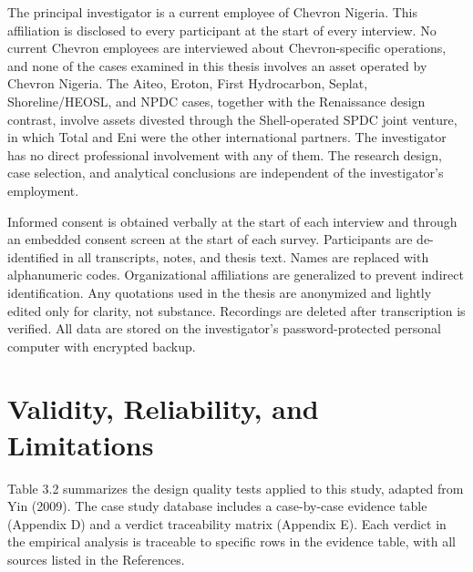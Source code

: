 The principal investigator is a current employee of Chevron Nigeria.
This affiliation is disclosed to every participant at the start of every
interview. No current Chevron employees are interviewed about
Chevron-specific operations, and none of the cases examined in this
thesis involves an asset operated by Chevron Nigeria. The Aiteo, Eroton,
First Hydrocarbon, Seplat, Shoreline/HEOSL, and NPDC cases, together
with the Renaissance design contrast, involve assets divested through
the Shell-operated SPDC joint venture, in which Total and Eni were the
other international partners. The investigator has no direct
professional involvement with any of them. The research design, case
selection, and analytical conclusions are independent of the
investigator's employment.

Informed consent is obtained verbally at the start of each interview and
through an embedded consent screen at the start of each survey.
Participants are de-identified in all transcripts, notes, and thesis
text. Names are replaced with alphanumeric codes. Organizational
affiliations are generalized to prevent indirect identification. Any
quotations used in the thesis are anonymized and lightly edited only for
clarity, not substance. Recordings are deleted after transcription is
verified. All data are stored on the investigator's password-protected
personal computer with encrypted backup.

\hypertarget{validity-reliability-and-limitations}{%
\section{Validity, Reliability, and
Limitations}\label{validity-reliability-and-limitations}}

Table 3.2 summarizes the design quality tests applied to this study,
adapted from Yin (2009). The case study database includes a case-by-case
evidence table (Appendix D) and a verdict traceability matrix (Appendix
E). Each verdict in the empirical analysis is traceable to specific rows
in the evidence table, with all sources listed in the References.

